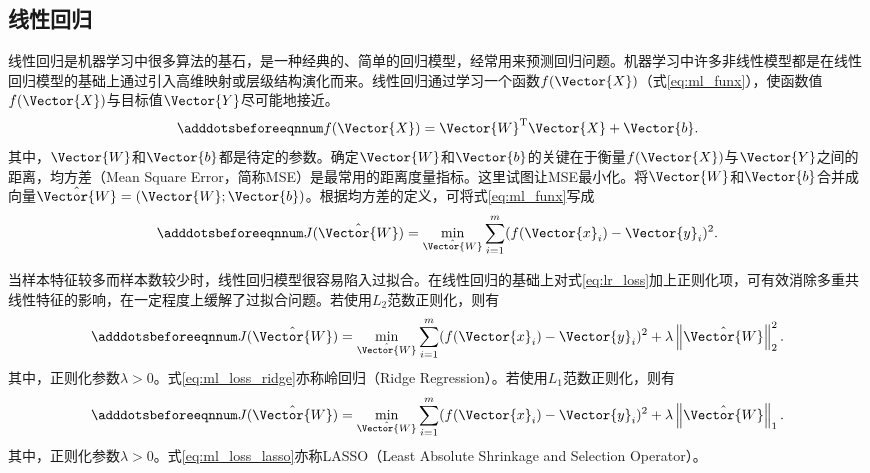 \subsection{线性回归}\label{sec:ml_lr}

线性回归是机器学习中很多算法的基石，是一种经典的、简单的回归模型，经常用来预测回归问题。机器学习中许多非线性模型都是在线性回归模型的基础上通过引入高维映射或层级结构演化而来。线性回归通过学习一个函数$f(\Vector{X})$（式\ref{eq:ml_funx}），使函数值$f(\Vector{X})$与目标值$\Vector{Y}$尽可能地接近。
\begin{equation}\adddotsbeforeeqnnum
  \label{eq:ml_funx}
  f(\Vector{X})=\Vector{W}^{\text{T}}\Vector{X}+\Vector{b}.
\end{equation}
其中，$\Vector{W}$和$\Vector{b}$都是待定的参数。确定$\Vector{W}$和$\Vector{b}$的关键在于衡量$f(\Vector{X})$与$\Vector{Y}$之间的距离，均方差（Mean Square Error，简称MSE）是最常用的距离度量指标。这里试图让MSE最小化。将$\Vector{W}$和$\Vector{b}$合并成向量$\hat{\Vector{W}}=(\Vector{W};\Vector{b})$。根据均方差的定义，可将式\ref{eq:ml_funx}写成
\begin{equation}\adddotsbeforeeqnnum
  \label{eq:lr_loss}
  J(\hat{\Vector{W}})=\min_{\hat{\Vector{W}}}\sum_{i=1}^{m}(f(\Vector{x}_i)-\Vector{y}_i)^2.
\end{equation}

当样本特征较多而样本数较少时，线性回归模型很容易陷入过拟合。在线性回归的基础上对式\ref{eq:lr_loss}加上正则化项，可有效消除多重共线性特征的影响，在一定程度上缓解了过拟合问题。若使用$L_2$范数正则化，则有
\begin{equation}\adddotsbeforeeqnnum
  \label{eq:ml_loss_ridge}
  J(\hat{\Vector{W}})=\min_{\hat{\Vector{W}}}\sum_{i=1}^{m}(f(\Vector{x}_i)-\Vector{y}_i)^2+\lambda\left\|\hat{\Vector{W}}\right\|_2^2.
\end{equation}
其中，正则化参数$\lambda>0$。式\ref{eq:ml_loss_ridge}亦称岭回归（Ridge Regression）。若使用$L_1$范数正则化，则有
\begin{equation}\adddotsbeforeeqnnum
  \label{eq:ml_loss_lasso}
  J(\hat{\Vector{W}})=\min_{\hat{\Vector{W}}}\sum_{i=1}^{m}(f(\Vector{x}_i)-\Vector{y}_i)^2+\lambda\left\|\hat{\Vector{W}}\right\|_1.
\end{equation}
其中，正则化参数$\lambda>0$。式\ref{eq:ml_loss_lasso}亦称LASSO（Least Absolute Shrinkage and Selection Operator）。

